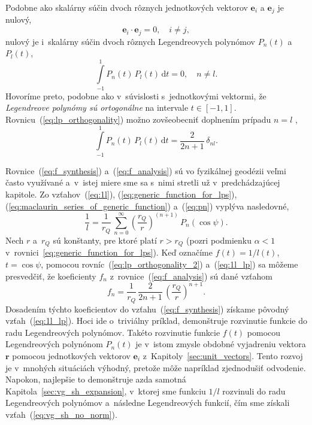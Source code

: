 \documentclass[a4paper,12pt]{book}
\newcommand{\diff}{\mathrm d}
\let\vec\mathbf
\begin{document}
Podobne ako skalárny súčin dvoch rôznych jednotkových vektorov $\vec e_i$ 
a $ \vec e_j$ je nulový,
%
\begin{equation}
\label{eq:ei_orthogonality}
\vec e_i \cdot \vec e_j = 0{,} \quad i \neq j{,}
\end{equation}
%
nulový je i~skalárny súčin dvoch rôznych Legendreovych polynómov $P_n(t)$ 
a $P_l(t)$,
%
\begin{equation}
\label{eq:lp_orthogonality}
\int\limits_{-1}^1 P_n(t) \, P_l(t) \, \diff t = 0{,} \quad n \neq l{.}
\end{equation}
%
Hovoríme preto, podobne ako v~súvislosti s~jednotkovými vektormi, že
\emph{Legendreove polynómy sú ortogonálne} na intervale $t \in [-1, 1].$
Rovnicu~(\ref{eq:lp_orthogonality}) možno zovšeobecniť doplnením prípadu $n
= l$ \parencite[napríklad][]{Hobson},
%
\begin{equation}
\label{eq:lp_orthogonality_2}
\int\limits_{-1}^1 P_n(t) \, P_l(t) \, \diff t = \frac{2}{2n + 1} \, 
\delta_{nl}{.}
\end{equation}

Rovnice~(\ref{eq:f_synthesis}) a~(\ref{eq:f_analysis}) sú vo fyzikálnej
geodézii veľmi často využívané a~v~istej miere sme sa s~nimi stretli už
v~predchádzajúcej kapitole.  Zo vzťahov~(\ref{eq:1l}),
(\ref{eq:generic_function_for_lps}),
(\ref{eq:maclaurin_series_of_generic_function}) a~(\ref{eq:pn}) vyplýva
nasledovné,
%
\begin{equation}
\label{eq:1l_lp}
\frac{1}{l} = \frac{1}{r_Q} \, \sum_{n = 0}^\infty \left( \frac{r_Q}{r}
\right)^{(n + 1)} \, P_n(\cos\psi){.}
\end{equation}
%
Nech $r$ a~$r_Q$ sú konštanty, pre ktoré platí $r > r_Q$ (pozri podmienku
$\alpha < 1$ v~rovnici~\ref{eq:generic_function_for_lps}).  Keď označíme $f(t)
= 1 \slash l(t)$, $t = \cos\psi$, pomocou rovníc~(\ref{eq:lp_orthogonality_2})
a~(\ref{eq:1l_lp}) sa môžeme presvedčiť, že koeficienty $f_n$
z~rovnice~(\ref{eq:f_analysis}) sú dané vzťahom
%
\begin{equation}
f_n = \frac{1}{r_Q} \, \frac{2}{2n + 1} \, \left( \frac{r_Q}{r} \right)^{n
+ 1}{.}
\end{equation}
%
Dosadením týchto koeficientov do vzťahu~(\ref{eq:f_synthesis}) získame pôvodný 
vzťah~(\ref{eq:1l_lp}).  Hoci ide o~triviálny príklad, demonštruje rozvinutie 
funkcie do radu Legendreových polynómov.  Takéto rozvinutie funkcie $f(t)$ 
pomocou Legendreových polynónom $P_n(t)$ je v~istom zmysle obdobné vyjadreniu 
vektora $\vec r$ pomocou jednotkových vektorov $\vec e_i$ 
z~Kapitoly~\ref{sec:unit_vectors}.  Tento rozvoj je v~mnohých situáciách 
výhodný, pretože môže napríklad zjednodušiť odvodenie.  Napokon, najlepšie to 
demonštruje azda samotná Kapitola~\ref{sec:vg_sh_expansion}, v~ktorej sme 
funkciu $1 \slash l$ rozvinuli do radu Legendreových polynómov a~následne 
Legendreových funkcií, čím sme získali vzťah~(\ref{eq:vg_sh_no_norm}).
\end{document}
